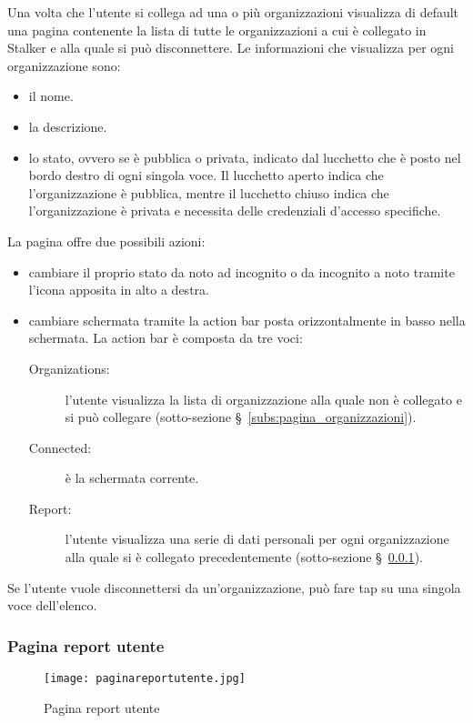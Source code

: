 \documentclass[../manuale-utente.tex]{subfiles}
\begin{document}
 Una volta che l'utente si collega ad una o più organizzazioni visualizza di default una pagina contenente la lista di tutte le organizzazioni a cui è collegato in Stalker e alla quale si può disconnettere.
 Le informazioni che visualizza per ogni organizzazione sono:
 \begin{itemize}
   \item il nome.
   \item la descrizione.
   \item lo stato, ovvero se è pubblica o privata, indicato dal lucchetto che è posto nel bordo destro di ogni singola voce. Il lucchetto aperto indica che l'organizzazione è pubblica, mentre il lucchetto chiuso indica che l'organizzazione è privata e necessita delle credenziali d'accesso specifiche.
 \end{itemize}
 La pagina offre due possibili azioni:
 \begin{itemize}
   \item cambiare il proprio stato da noto ad incognito o da incognito a noto tramite l'icona apposita in alto a destra.
   \item cambiare schermata tramite la action bar posta orizzontalmente in basso nella schermata. La action bar è composta da tre voci:
   \begin{description}
     \item[Organizations:] l'utente visualizza la lista di organizzazione alla quale non è collegato e si può collegare (sotto-sezione §~\ref{subs:pagina_organizzazioni}).
     \item[Connected:] è la schermata corrente.
     \item[Report:] l'utente visualizza una serie di dati personali per ogni organizzazione alla quale si è collegato precedentemente (sotto-sezione §~\ref{subs:pagina_report_utente}).
   \end{description}
 \end{itemize}
 Se l'utente vuole disconnettersi da un'organizzazione, può fare tap su una singola voce dell'elenco.

\subsubsection{Pagina report utente}%
\label{subs:pagina_report_utente}

 \begin{figure}[H]
   \centering
   \texttt{[image: paginareportutente.jpg]}
   \caption{Pagina report utente}%
   \label{fig:mobile_app_pagina_report_utente}
 \end{figure}
\end{document}
